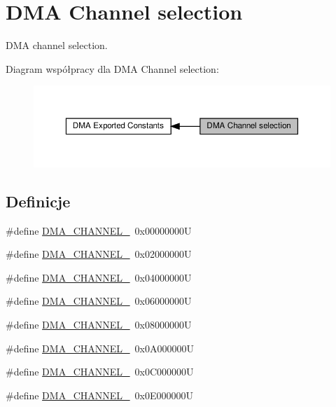 \hypertarget{group___d_m_a___channel__selection}{}\section{D\+MA Channel selection}
\label{group___d_m_a___channel__selection}


D\+MA channel selection.  


Diagram współpracy dla D\+MA Channel selection\+:\nopagebreak
\begin{figure}[H]
\begin{center}
\leavevmode
\includegraphics[width=350pt]{group___d_m_a___channel__selection}
\end{center}
\end{figure}
\subsection*{Definicje}
\begin{DoxyCompactItemize}
\item 
\#define \hyperlink{group___d_m_a___channel__selection_gabd7de138931e93a90fc6c4eab5916bbe}{D\+M\+A\+\_\+\+C\+H\+A\+N\+N\+E\+L\+\_}~0x00000000U
\item 
\#define \hyperlink{group___d_m_a___channel__selection_ga283364370e9876af6406b9fa70e2944f}{D\+M\+A\+\_\+\+C\+H\+A\+N\+N\+E\+L\+\_}~0x02000000U
\item 
\#define \hyperlink{group___d_m_a___channel__selection_ga9688f3e78cbc2109d214b7ca049e22df}{D\+M\+A\+\_\+\+C\+H\+A\+N\+N\+E\+L\+\_}~0x04000000U
\item 
\#define \hyperlink{group___d_m_a___channel__selection_gac689673fec4d72ede49a0d657e3a7e70}{D\+M\+A\+\_\+\+C\+H\+A\+N\+N\+E\+L\+\_}~0x06000000U
\item 
\#define \hyperlink{group___d_m_a___channel__selection_ga51b51f5b39e23b28ad99520ad5be596f}{D\+M\+A\+\_\+\+C\+H\+A\+N\+N\+E\+L\+\_}~0x08000000U
\item 
\#define \hyperlink{group___d_m_a___channel__selection_gafbaa82f3cff89858e50363c04ed0cca0}{D\+M\+A\+\_\+\+C\+H\+A\+N\+N\+E\+L\+\_}~0x0\+A000000U
\item 
\#define \hyperlink{group___d_m_a___channel__selection_gad23679661d8da3bc1aaacc62f99821f7}{D\+M\+A\+\_\+\+C\+H\+A\+N\+N\+E\+L\+\_}~0x0\+C000000U
\item 
\#define \hyperlink{group___d_m_a___channel__selection_ga77ff4e8675a3991feb20e385242f34ab}{D\+M\+A\+\_\+\+C\+H\+A\+N\+N\+E\+L\+\_}~0x0\+E000000U
\end{DoxyCompactItemize}


